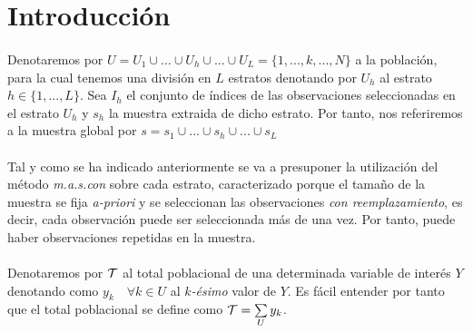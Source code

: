 \documentclass{article}
\begin{document}
  \maketitle



  \section{Introducción}

    \paragraph{}
    Denotaremos por $U = U_1 \cup ... \cup U_h \cup... \cup U_L = \{1, ...,k,...,N\} $ a la población, para la cual tenemos una división en $L$ estratos denotando por $U_h$ al estrato $h \in \{1,..., L\}$. Sea $I_h$ el conjunto de índices de las observaciones seleccionadas en el estrato $U_h$ y $s_h$ la muestra extraida de dicho estrato. Por tanto, nos referiremos a la muestra global por $s = s_1 \cup ... \cup s_h \cup ... \cup s_L$

    \paragraph{}
    Tal y como se ha indicado anteriormente se va a presuponer la utilización del método \emph{m.a.s.con} sobre cada estrato, caracterizado porque el tamaño de la muestra se fija \emph{a-priori} y se seleccionan las observaciones \emph{con reemplazamiento}, es decir, cada observación puede ser seleccionada más de una vez. Por tanto, puede haber observaciones repetidas en la muestra.

    \paragraph{}
    Denotaremos por $\mathcal{T}$ al total poblacional de una determinada variable de interés $Y$ denotando como $y_k \quad \forall k \in U$ al \emph{$k$-ésimo} valor de $Y$. Es fácil entender por tanto que el total poblacional se define como $\mathcal{T} = \sum\limits_U y_k$.
\end{document}
